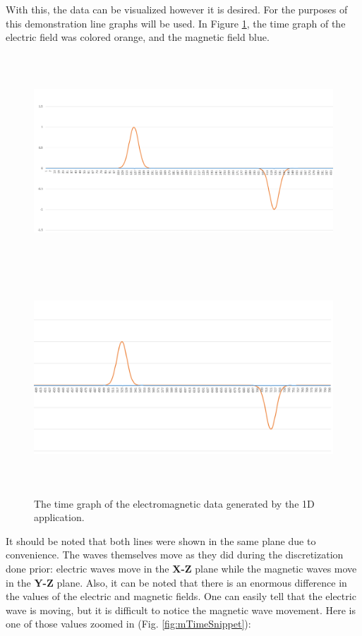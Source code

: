 \clearpage

With this, the data can be visualized however it is desired. For the purposes of this demonstration line graphs will be used. In Figure \ref{fig:emTimeGraph}, the time graph of the electric field was colored orange, and the magnetic field blue.

\begin{figure}[h!]
	\centering
	\includegraphics[height= 8cm,width=\textwidth]{Figures/1DtimeGraph1}\\
	\includegraphics[height= 8cm,width=\textwidth]{Figures/1DtimeGraph2}
	\decoRule
	\caption[1D Electromagnetic Time Graph]{The time graph of the electromagnetic data generated by the 1D application.}
	\label{fig:emTimeGraph}
\end{figure}

\clearpage

It should be noted that both lines were shown in the same plane due to convenience. The waves themselves move as they did during the discretization done prior: electric waves move in the \textbf{X-Z} plane while the magnetic waves move in the \textbf{Y-Z} plane. Also, it can be noted that there is an enormous difference in the values of the electric and magnetic fields. One can easily tell that the electric wave is moving, but it is difficult to notice the magnetic wave movement. Here is one of those values zoomed in (Fig. \ref{fig:mTimeSnippet}):

